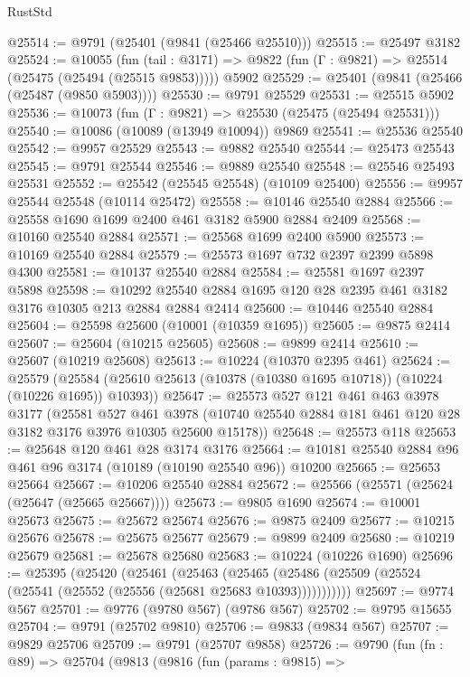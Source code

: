 \begin{lexlean}{RustStd}
\begin{coremodule}
@25514 := @9791 (@25401 (@9841 (@25466 @25510)))
@25515 := @25497 @3182
@25524 := @10055
    (fun (tail : @3171) => @9822 (fun (Γ : @9821) => @25514 (@25475 (@25494 (@25515 @9853)))))
    @5902
@25529 := @25401 (@9841 (@25466 (@25487 (@9850 @5903))))
@25530 := @9791 @25529
@25531 := @25515 @5902
@25536 := @10073 (fun (Γ : @9821) => @25530 (@25475 (@25494 @25531)))
@25540 := @10086 (@10089 (@13949 @10094)) @9869
@25541 := @25536 @25540
@25542 := @9957 @25529
@25543 := @9882 @25540
@25544 := @25473 @25543
@25545 := @9791 @25544
@25546 := @9889 @25540
@25548 := @25546 @25493 @25531
@25552 := @25542 (@25545 @25548) (@10109 @25400)
@25556 := @9957 @25544 @25548 (@10114 @25472)
@25558 := @10146 @25540 @2884
@25566 := @25558 @1690 @1699 @2400 @461 @3182 @5900 @2884 @2409
@25568 := @10160 @25540 @2884
@25571 := @25568 @1699 @2400 @5900
@25573 := @10169 @25540 @2884
@25579 := @25573 @1697 @732 @2397 @2399 @5898 @4300
@25581 := @10137 @25540 @2884
@25584 := @25581 @1697 @2397 @5898
@25598 := @10292 @25540 @2884 @1695 @120 @28 @2395 @461 @3182 @3176 @10305 @213 @2884 @2884 @2414
@25600 := @10446 @25540 @2884
@25604 := @25598 @25600 (@10001 (@10359 @1695))
@25605 := @9875 @2414
@25607 := @25604 (@10215 @25605)
@25608 := @9899 @2414
@25610 := @25607 (@10219 @25608)
@25613 := @10224 (@10370 @2395 @461)
@25624 := @25579
    (@25584 (@25610 @25613 (@10378 (@10380 @1695 @10718)) (@10224 (@10226 @1695)) @10393))
@25647 := @25573
    @527
    @121
    @461
    @463
    @3978
    @3177
    (@25581
      @527
      @461
      @3978
      (@10740 @25540 @2884 @181 @461 @120 @28 @3182 @3176 @3976 @10305 @25600 @15178))
@25648 := @25573 @118
@25653 := @25648 @120 @461 @28 @3174 @3176
@25664 := @10181 @25540 @2884 @96 @461 @96 @3174 (@10189 (@10190 @25540 @96)) @10200
@25665 := @25653 @25664
@25667 := @10206 @25540 @2884
@25672 := @25566 (@25571 (@25624 (@25647 (@25665 @25667))))
@25673 := @9805 @1690
@25674 := @10001 @25673
@25675 := @25672 @25674
@25676 := @9875 @2409
@25677 := @10215 @25676
@25678 := @25675 @25677
@25679 := @9899 @2409
@25680 := @10219 @25679
@25681 := @25678 @25680
@25683 := @10224 (@10226 @1690)
@25696 := @25395
    (@25420
      (@25461
        (@25463
          (@25465 (@25486 (@25509 (@25524 (@25541 (@25552 (@25556 (@25681 @25683 @10393)))))))))))
@25697 := @9774 @567
@25701 := @9776 (@9780 @567) (@9786 @567)
@25702 := @9795 @15655
@25704 := @9791 (@25702 @9810)
@25706 := @9833 (@9834 @567)
@25707 := @9829 @25706
@25709 := @9791 (@25707 @9858)
@25726 := @9790
    (fun (fn : @89) =>
    @25704
      (@9813
        (@9816
          (fun (params : @9815) =>

\end{coremodule}
\end{lexlean}
